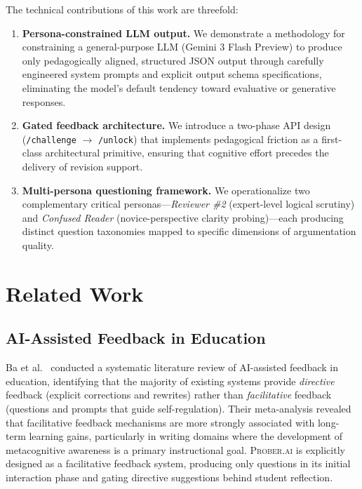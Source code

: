 \documentclass[11pt,a4paper]{article}
\begin{document}
The technical contributions of this work are threefold:

\begin{enumerate}[leftmargin=*]
    \item \textbf{Persona-constrained LLM output.} We demonstrate a methodology for constraining a general-purpose LLM (Gemini 3 Flash Preview) to produce only pedagogically aligned, structured JSON output through carefully engineered system prompts and explicit output schema specifications, eliminating the model's default tendency toward evaluative or generative responses.

    \item \textbf{Gated feedback architecture.} We introduce a two-phase API design (\texttt{/challenge} $\rightarrow$ \texttt{/unlock}) that implements pedagogical friction as a first-class architectural primitive, ensuring that cognitive effort precedes the delivery of revision support.

    \item \textbf{Multi-persona questioning framework.} We operationalize two complementary critical personas---\textit{Reviewer \#2} (expert-level logical scrutiny) and \textit{Confused Reader} (novice-perspective clarity probing)---each producing distinct question taxonomies mapped to specific dimensions of argumentation quality.
\end{enumerate}

\section{Related Work}
\label{sec:related_work}

\subsection{AI-Assisted Feedback in Education}

Ba et al.~\cite{ba2025unraveling} conducted a systematic literature review of AI-assisted feedback in education, identifying that the majority of existing systems provide \textit{directive} feedback (explicit corrections and rewrites) rather than \textit{facilitative} feedback (questions and prompts that guide self-regulation). Their meta-analysis revealed that facilitative feedback mechanisms are more strongly associated with long-term learning gains, particularly in writing domains where the development of metacognitive awareness is a primary instructional goal. \textsc{Prober.ai} is explicitly designed as a facilitative feedback system, producing only questions in its initial interaction phase and gating directive suggestions behind student reflection.
\end{document}
